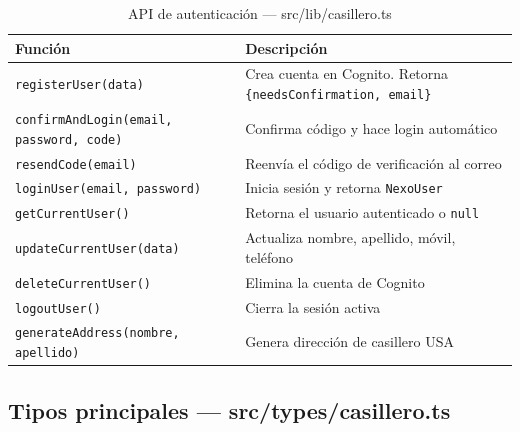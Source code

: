 \documentclass[12pt,a4paper]{article}
\begin{document}
\begin{table}[H]
\centering
\begin{tabular}{@{}ll@{}}
\toprule
\textbf{Función} & \textbf{Descripción} \\
\midrule
\texttt{registerUser(data)} & Crea cuenta en Cognito. Retorna \texttt{\{needsConfirmation, email\}} \\
\texttt{confirmAndLogin(email, password, code)} & Confirma código y hace login automático \\
\texttt{resendCode(email)} & Reenvía el código de verificación al correo \\
\texttt{loginUser(email, password)} & Inicia sesión y retorna \texttt{NexoUser} \\
\texttt{getCurrentUser()} & Retorna el usuario autenticado o \texttt{null} \\
\texttt{updateCurrentUser(data)} & Actualiza nombre, apellido, móvil, teléfono \\
\texttt{deleteCurrentUser()} & Elimina la cuenta de Cognito \\
\texttt{logoutUser()} & Cierra la sesión activa \\
\texttt{generateAddress(nombre, apellido)} & Genera dirección de casillero USA \\
\bottomrule
\end{tabular}
\caption{API de autenticación --- src/lib/casillero.ts}
\end{table}

\subsection{Tipos principales --- src/types/casillero.ts}
\end{document}
